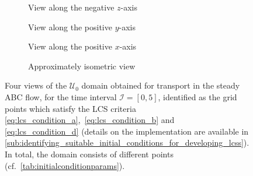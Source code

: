 \begin{figure}[htpb]
    \centering
    \begin{subfigure}[b]{0.475\textwidth}
        \centering
        \caption[]{{\small View along the negative $z$-axis}}
        \label{fig:steady_abd_z}
    \end{subfigure}
    \begin{subfigure}[b]{0.475\textwidth}
        \centering
        \caption[]{{\small View along the positive $y$-axis}}
        \label{fig:steady_abd_y}
    \end{subfigure}

    \begin{subfigure}[b]{0.475\textwidth}
        \centering
        \caption[]{{\small View along the positive $x$-axis}}
        \label{fig:steady_abd_x}
    \end{subfigure}
    \begin{subfigure}[b]{0.475\textwidth}
        \centering
        \caption[]{{\small Approximately isometric view}}
        \label{fig:steady_abd_isometric}
    \end{subfigure}
    \caption[Four views of the $\mathcal{U}_{0}$ domain obtained for transport
    in the steady ABC flow]
    {
        Four views of the $\mathcal{U}_{0}$ domain obtained for transport in the
        steady ABC flow, for the time interval $\mathcal{I}=[0,5]$, identified
        as the grid points which satisfy the LCS criteria
        \eqref{eq:lcs_condition_a},~\eqref{eq:lcs_condition_b} and~
        \eqref{eq:lcs_condition_d} (details on the implementation are available
        in
        \cref{sub:identifying_suitable_initial_conditions_for_developing_lcss}).
        In total, the domain consists of  different points
        (cf.\ \cref{tab:initialconditionparams}).
}
    \label{fig:steady_abd}
\end{figure}

